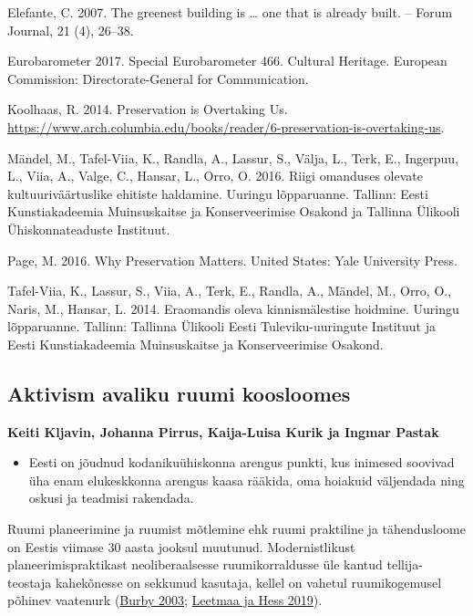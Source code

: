\documentclass[estonian,]{article}
\providecommand{\tightlist}{%
  \setlength{\itemsep}{0pt}\setlength{\parskip}{0pt}}
\begin{document}
Elefante, C. 2007. The greenest building is \ldots{} one that is already built. -- Forum Journal, 21 (4), 26--38.

Eurobarometer 2017. Special Eurobarometer 466. Cultural Heritage. European Commission: Directorate-General for Communication.

Koolhaas, R. 2014. Preservation is Overtaking Us. \url{https://www.arch.columbia.edu/books/reader/6-preservation-is-overtaking-us}.

Mändel, M., Tafel-Viia, K., Randla, A., Lassur, S., Välja, L., Terk, E., Ingerpuu, L., Viia, A., Valge, C., Hansar, L., Orro, O. 2016. Riigi omanduses olevate kultuuriväärtuslike ehitiste haldamine. Uuringu lõpparuanne. Tallinn: Eesti Kunstiakadeemia Muinsuskaitse ja Konserveerimise Osakond ja Tallinna Ülikooli Ühiskonnateaduste Instituut.

Page, M. 2016. Why Preservation Matters. United States: Yale University Press.

Tafel-Viia, K., Lassur, S., Viia, A., Terk, E., Randla, A., Mändel, M., Orro, O., Naris, M., Hansar, L. 2014. Eraomandis oleva kinnismälestise hoidmine. Uuringu lõpparuanne. Tallinn: Tallinna Ülikooli Eesti Tuleviku-uuringute Instituut ja Eesti Kunstiakadeemia Muinsuskaitse ja Konserveerimise Osakond.

\hypertarget{aktivism-avaliku-ruumi-koosloomes}{%
\subsection{Aktivism avaliku ruumi koosloomes}\label{aktivism-avaliku-ruumi-koosloomes}}

\begin{authors}
\textbf{Keiti Kljavin, Johanna Pirrus, Kaija-Luisa Kurik ja Ingmar
Pastak}
\end{authors}

\begin{points}
\begin{itemize}
\tightlist
\item
  Eesti on jõudnud kodanikuühiskonna arengus punkti, kus inimesed
  soovivad üha enam elukeskkonna arengus kaasa rääkida, oma hoiakuid
  väljendada ning oskusi ja teadmisi rakendada.
\end{itemize}
\end{points}

Ruumi planeerimine ja ruumist mõtlemine ehk ruumi praktiline ja tähendusloome on Eestis viimase 30 aasta jooksul muutunud. Modernistlikust planeerimispraktikast neoliberaalsesse ruumikorraldusse üle kantud tellija-teostaja kahekõnesse on sekkunud kasutaja, kellel on vahetul ruumikogemusel põhinev vaatenurk (\protect\hyperlink{Burby2003}{Burby 2003}; \protect\hyperlink{Leetmaa2019}{Leetmaa ja Hess 2019}).
\end{document}
